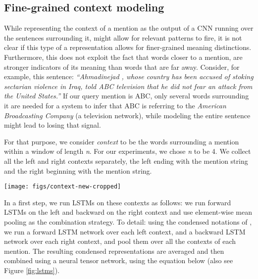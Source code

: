 \documentclass[letterpaper]{article} \usepackage{aaai18}  \usepackage{times}  \usepackage{helvet}  \usepackage{courier}  \usepackage{url}  \usepackage{graphicx}  \frenchspacing  \setlength{\pdfpagewidth}{8.5in}  \setlength{\pdfpageheight}{11in}  \usepackage{latexsym}
\begin{document}
\subsection{Fine-grained context modeling}
\label{context-repr}
While representing the context of a mention as the output of a CNN running over the sentences surrounding it, might allow for relevant patterns to fire, it is not clear if this type of a representation allows for finer-grained meaning distinctions. Furthermore, this does not exploit the fact that words closer to a mention, are stronger indicators of its meaning than words that are far away. Consider, for example, this sentence: \textit{``Ahmadinejad , whose country has been accused of stoking sectarian violence in Iraq, told ABC television that he did not fear an attack from the United States.''} If our query mention is ABC, only several words surrounding it are needed for a system to infer that ABC is referring to the \textit{American Broadcasting Company} (a television network), while modeling the entire sentence might lead to losing that signal.

For that purpose, we consider \textit{context} to be the words surrounding a mention within a window of length \textit{n}. For our experiments, we chose \textit{n} to be 4. We collect all the left and right contexts separately, the left ending with the mention string and the right beginning with the mention string.
\begin{figure*}
\begin{center}
\texttt{[image: figs/context-new-cropped]}
\end{center}
\caption{Modeling of fine grained context using LSTMs and NTNs from the left and right contexts obtained from the coreference chain of the query entity.}
\label{fig:lstms}
\end{figure*}






In a first step, we run LSTMs on these contexts as follows: we run forward LSTMs on the left and backward on the right context and use element-wise mean pooling as the combination strategy. To detail: 
using the condensed notations of \cite{DBLP:journals/corr/ChengDL16}, we run a forward LSTM network over each left context, and a backward LSTM network over each right context, and pool them over all the contexts of each mention. The resulting condensed representations are averaged and then combined using a neural tensor network, using the equation below (also see Figure \ref{fig:lstms}).
\end{document}
